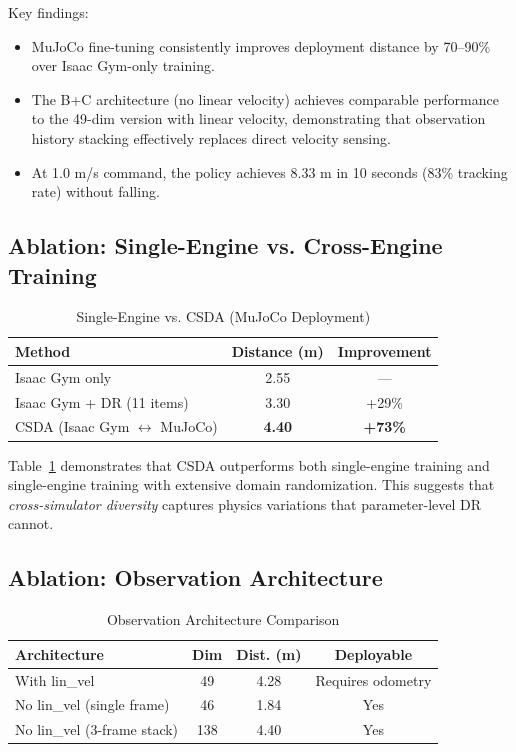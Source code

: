\documentclass[conference]{IEEEtran}
\begin{document}
Key findings:
\begin{itemize}
    \item MuJoCo fine-tuning consistently improves deployment distance by 70--90\% over Isaac Gym-only training.
    \item The B+C architecture (no linear velocity) achieves comparable performance to the 49-dim version with linear velocity, demonstrating that observation history stacking effectively replaces direct velocity sensing.
    \item At 1.0 m/s command, the policy achieves 8.33 m in 10 seconds (83\% tracking rate) without falling.
\end{itemize}

\subsection{Ablation: Single-Engine vs. Cross-Engine Training}

\begin{table}[t]
\caption{Single-Engine vs. CSDA (MuJoCo Deployment)}
\label{tab:ablation_engine}
\centering
\begin{tabular}{lcc}
\toprule
\textbf{Method} & \textbf{Distance (m)} & \textbf{Improvement} \\
\midrule
Isaac Gym only & 2.55 & --- \\
Isaac Gym + DR (11 items) & 3.30 & +29\% \\
CSDA (Isaac Gym $\leftrightarrow$ MuJoCo) & \textbf{4.40} & \textbf{+73\%} \\
\bottomrule
\end{tabular}
\end{table}

Table~\ref{tab:ablation_engine} demonstrates that CSDA outperforms both single-engine training and single-engine training with extensive domain randomization. This suggests that \textit{cross-simulator diversity} captures physics variations that parameter-level DR cannot.

\subsection{Ablation: Observation Architecture}

\begin{table}[t]
\caption{Observation Architecture Comparison}
\label{tab:ablation_obs}
\centering
\begin{tabular}{lccc}
\toprule
\textbf{Architecture} & \textbf{Dim} & \textbf{Dist. (m)} & \textbf{Deployable} \\
\midrule
With lin\_vel & 49 & 4.28 & Requires odometry \\
No lin\_vel (single frame) & 46 & 1.84 & Yes \\
No lin\_vel (3-frame stack) & 138 & 4.40 & Yes \\
\bottomrule
\end{tabular}
\end{table}
\end{document}
